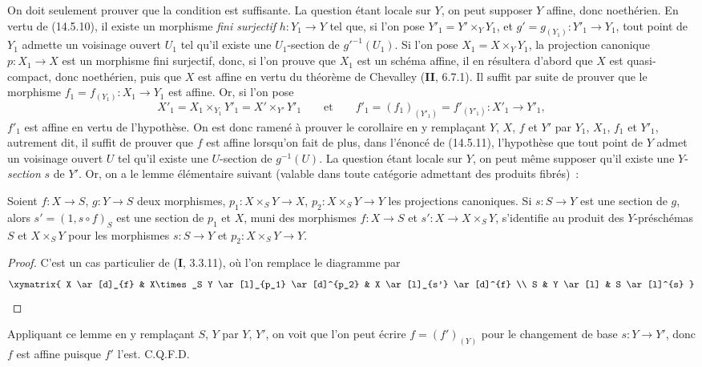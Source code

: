 On doit seulement prouver que la condition est suffisante. La question étant locale
sur $Y$, on peut supposer $Y$ affine, donc noethérien. En vertu de (14.5.10), il
existe un morphisme \emph{fini surjectif} $h:Y_1\to Y$ tel que, si l'on pose
$Y'_1=Y'\times_Y Y_1$, et $g'=g_{(Y_1)}:Y'_1\to Y_1$, tout point de $Y_1$ admette
un voisinage ouvert $U_1$ tel qu'il existe une $U_1$-section de $g'^{-1}(U_1)$. Si
l'on pose $X_1=X\times_Y Y_1$, la projection canonique $p:X_1\to X$ est un
morphisme fini surjectif, donc, si l'on prouve que $X_1$ est un schéma affine, il en
résultera d'abord que $X$ est quasi-compact, donc noethérien, puis que $X$ est affine
en vertu du théorème de Chevalley (\textbf{II}, 6.7.1). Il suffit par suite de
prouver que le morphisme $f_1=f_{(Y_1)}:X_1\to Y_1$ est affine. Or, si l'on pose
\[
  X'_1=X_1\times_{Y_1}Y'_1=X'\times_{Y'}Y'_1
  \qquad\text{et}\qquad
  f'_1=(f_1)_{(Y'_1)}=f'_{(Y'_1)}:X'_1\to Y'_1,
\]
$f'_1$ est affine en vertu de l'hypothèse. On est donc ramené à prouver le corollaire
en y remplaçant $Y$, $X$, $f$ et $Y'$ par $Y_1$, $X_1$, $f_1$ et $Y'_1$,
autrement dit, il suffit de prouver que $f$ est affine lorsqu'on fait de plus, dans
l'énoncé de (14.5.11), l'hypothèse que tout point de $Y$ admet un voisinage ouvert
$U$ tel qu'il existe une $U$-section de $g^{-1}(U)$. La question étant locale sur
$Y$, on peut même supposer qu'il existe une $Y$-\emph{section} $s$ de $Y'$. Or, on a le
lemme élémentaire suivant (valable dans toute catégorie admettant des produits
fibrés)~:

\begin{lemma}[14.5.11.1]
\label{IV.14.5.11.1-fr}
Soient $f:X\to S$, $g:Y\to S$ deux morphismes, $p_1:X\times_S Y\to X$,
$p_2:X\times_S Y\to Y$ les projections canoniques. Si $s:S\to Y$ est une section
de $g$, alors $s'=(1,s\circ f)_S$ est une section de $p_1$ et $X$, muni des
morphismes $f:X\to S$ et $s':X\to X\times_S Y$, s'identifie au produit des
$Y$-préschémas $S$ et $X\times_S Y$ pour les morphismes $s:S\to Y$ et
$p_2:X\times_S Y\to Y$.
\end{lemma}


\begin{proof}
C'est un cas particulier de (\textbf{I}, 3.3.11), où l'on remplace le diagramme par
\[
  \xymatrix{
    X \ar[d]_{f} & X\times_S Y \ar[l]_{p_1} \ar[d]^{p_2} & X \ar[l]_{s'} \ar[d]^{f} \\
    S & Y \ar[l] & S \ar[l]^{s}
  }
\]
\end{proof}
\noindent Appliquant ce lemme en y remplaçant $S$, $Y$ par $Y$, $Y'$, on voit que l'on peut
écrire $f=(f')_{(Y)}$ pour le changement de base $s:Y\to Y'$, donc $f$ est affine
puisque $f'$ l'est. C.Q.F.D.

